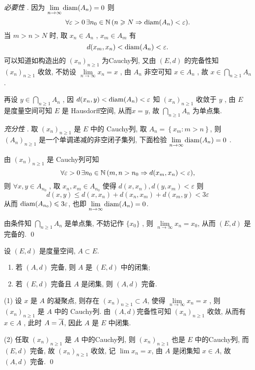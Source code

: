	\begin{Proof}
	   \textsl{必要性} . 因为 $ \lim\limits_{n\to\infty}\diam(A_{n})=0 $ 则
	   \[
		  \forall \varepsilon>0\,\exists n_{0}\in\N\,(n\geqslant N\Rightarrow \diam(A_{n})<\varepsilon).
	   \]
	   当 $ m>n>N $ 时, 取 $ x_{n}\in A_{n} $ , $ x_{m}\in A_{m} $ 有
	   \[
		  d(x_{m}, x_{n})<\diam(A_{n})<\varepsilon.
	   \]
	   可以知道如构造出的 $ (x_{n})_{n\geqslant1} $ 为Cauchy列, 又由 $ (E, d) $ 的完备性知 $ (x_{n})_{n\geqslant1} $ 收敛, 不妨设 $\lim\limits_{n\to\infty}x_{n}=x$ , 由 $ A_{n} $ 非空可知 $ x\in A_{n} $ , 故 $ x\in\bigcap\limits_{n\geqslant1}A_{n} $ .

	   再设 $ y\in\bigcap\limits_{n\geqslant1} A_{n} $ , 因 $ d(x_{n}, y)<\diam(A_{n})<\varepsilon $ 知 $ (x_{n})_{n\geqslant1} $ 收敛于 $ y $ , 由 $ E $ 是度量空间可知 $ E $ 是 Hausdorff空间, 从而$ x=y $, 故 $ \bigcap\limits_{n\geqslant1} A_{n} $ 为单点集.

	   \textsl{充分性} . 取 $ (x_{n})_{n\geqslant1} $ 是 $ E $ 中的 Cauchy列, 取 $ A_{n}=\left\{ x_{m}:m>n \right\} $, 则 $ (A_{n})_{n\geqslant1} $ 是一个单调递减的非空闭子集列, 下面检验 $ \lim\limits_{n\to\infty}\diam(A_{n})=0 $ .

	   由 $ (x_{n})_{n\geqslant1} $ 是 Cauchy列可知
	   \[
		  \forall \varepsilon>0\, \exists n_{0}\in\N\,(m, n>n_{0}\Rightarrow d(x_{m}, x_{n})<\varepsilon),
	   \]
	   则 $ \forall x, y\in A_{n_{0}} $ , 取 $ x_{n}, x_{m}\in A_{n_{0}} $ 使得 $ d(x, x_{n}), d(y, x_{m})<\varepsilon $ 则
	   \[
		  d(x, y)\leqslant d(x, x_{n})+d(x_{n}, x_{m})+d(x_{m}, y) < 3\varepsilon
	   \]
	   从而 $ \diam(A_{n_{0}})\leqslant3\varepsilon $, 也即 $\lim\limits_{n\to\infty} \diam(A_{n})=0 $.

	   由条件知 $ \bigcap\limits_{n\geqslant1}A_{n} $ 是单点集, 不妨记作 $ \{ x_{0} \} $ , 则 $ \lim\limits_{n\to\infty}x_{n}=x_{0} $, 从而 $ (E, d) $  是完备的. \qed
	\end{Proof}
	\begin{Theorem}
	   设 $ (E, d) $ 是度量空间, $ A\subset E $.
	   \begin{enumerate}[(1)]
		  \item 若 $ (A, d) $ 完备, 则 $ A $ 是 $ (E, d) $ 中的闭集;
		  \item 若 $ (E, d) $ 完备且 $ A $ 是闭集, 则 $ (A, d) $ 完备.
	   \end{enumerate}
	\end{Theorem}
	\begin{Proof}
	   (1) 设 $ x $ 是 $ A $ 的凝聚点, 则存在 $ (x_{n})_{n\geqslant1}\subset A $, 使得 $ \lim\limits_{n\to\infty}x_{n}=x $ , 则 $ (x_{n})_{n\geqslant1} $ 是 $ A $ 中的 Cauchy列. 由 $ (A, d) $完备性可知 $ (x_{n})_{n\geqslant1} $ 收敛, 从而有 $ x\in A $ , 此时 $ A=\baro{A} $, 因此 $ A $ 是 $ E $ 中闭集.

	   (2) 任取 $ (x_{n})_{n\geqslant1} $ 是 $ A $ 中的Cauchy列, 则 $ (x_{n})_{n\geqslant1} $ 也是 $ E $ 中的Cauchy列, 而 $ (E, d) $ 完备, 故 $ (x_{n})_{n\geqslant1} $ 收敛, 记 $ \lim\limits x_{n}=x $, 由 $ A $ 是闭集知 $ x\in A $, 故 $ (A, d) $ 完备. \qed
	\end{Proof}
